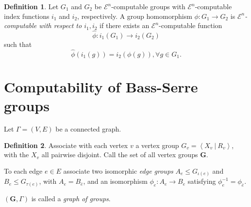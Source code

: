 \documentclass[a4paper]{article}
\newcommand{\grz}[1]{$\mathcal{E}^{#1}$}	%
\newcommand{\Zpos}{\mathbb{Z}_{\geq 0}}
\newcommand{\present}[2]{\left \langle #1 \: | \: #2 \right \rangle}	%
\theoremstyle{plain}
\newtheorem{theorem}{Theorem}[section]
\theoremstyle{definition}
\newtheorem{definition}[theorem]{Definition}
\begin{document}
	
\begin{definition}
	Let $G_1$ and $G_2$ be \grz{n}-computable groups with \grz{n}-computable index functions $i_1$ and $i_2$, respectively. A group homomorphism $\phi: G_1 \rightarrow G_2$ is {\it \grz{n}-computable with respect to $i_1,i_2$} if there exists an \grz{n}-computable function \[\hat{\phi}: i_1(G_1) \rightarrow i_2(G_2)\]
	such that
\[	\hat{\phi}(i_1(g)) = i_2(\phi(g)), \forall g \in G_1. \]
\end{definition}

\begin{comment}
		\begin{definition} \cite[Definition 3.3]{Cannonito_1973}
			A group $G$ is ``standard'' relative to an index $(i,m,j)$ if $i$ is defined by minimalisation from a presentation $1 \rightarrow K \rightarrow F \rightarrow G \rightarrow 1$ for $F$ free on at most countably many generators, $n \geq 3$, and $A \subset \Zpos$.
		\end{definition}

		\begin{theorem} \cite[Theorem 3.4]{Cannonito_1973}
			If $G$ is finitely generated and \grz{n}$(A)$ for $n \geq 3$ then any standard index of $G$ is \grz{n}$(A)$.
		\end{theorem}
\end{comment}

\section{Computability of Bass-Serre groups \label{bass-serre}}

Let $\Gamma = (V,E)$ be a connected graph. 

\begin{definition}
Associate with each vertex $v$ a vertex group $G_v = \present{X_v}{R_v}$, with the $X_v$ all pairwise disjoint. Call the set of all vertex groups $\mathbf{G}$. 

To each edge $e \in E$ associate two isomorphic {\it edge groups} $A_e \leq G_{\iota(e)}$ and $B_e \leq G_{\tau(e)}$, with $A_e = B_{\bar{e}}$, and an isomorphism $\phi_e : A_e \rightarrow B_e$ satisfying $\phi_e^{-1} = \phi_{\bar{e}}$.

$(\mathbf{G},\Gamma)$ is called a {\it graph of groups}.
\end{definition}
\end{document}
